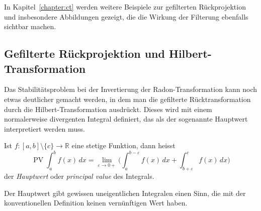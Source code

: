 In Kapitel~\ref{chapter:ct} werden weitere Beispiele zur gefilterten
Rückprojektion und insbesondere Abbildungen gezeigt, die die Wirkung
der Filterung ebenfalls sichtbar machen.

%
%
\subsection{Gefilterte Rückprojektion und Hilbert-Transformation}
Das Stabilitätsproblem bei der Invertierung der Radon-Transformation
kann noch etwas deutlicher gemacht werden, in dem man die gefilterte
Rücktransformation durch die Hilbert-Transformation ausdrückt.
Dieses wird mit einem normalerweise divergenten Integral definiert,
das als der sogenannte Hauptwert interpretiert werden muss.

\begin{definition}[Hauptwert]
Ist $f\colon[a,b]\setminus\{c\}\to\mathbb{R}$ eine stetige Funktion,
dann heisst
\[
\operatorname{PV}
\int_a^b f(x)\,dx
=
\lim_{\varepsilon\to 0+}
\biggl(
\int_a^{b-\varepsilon} f(x)\,dx
+
\int_{b+\varepsilon}^c f(x)\,dx
\biggr)
\]
der {\em Hauptwert} oder {\em principal value} des Integrals.
%
%
\end{definition}

Der Hauptwert gibt gewissen uneigentlichen Integralen einen Sinn, 
die mit der konventionellen Definition keinen vernünftigen Wert haben.

